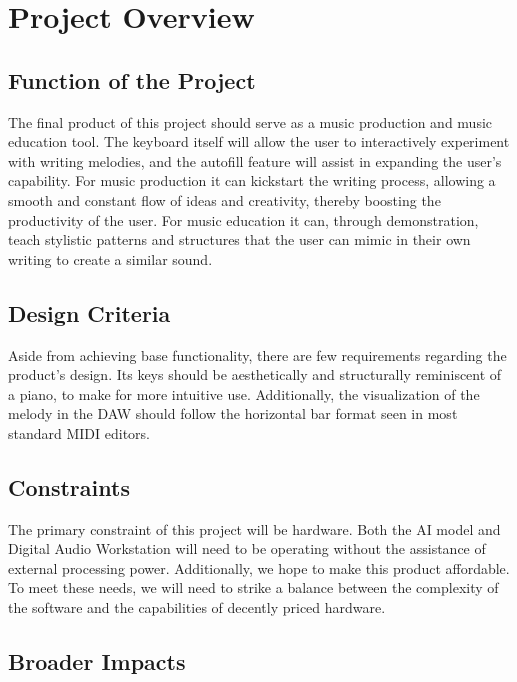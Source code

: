 \section{Project Overview}
\subsection{Function of the Project}

The final product of this project should serve as a music production and music
education tool. The keyboard itself will allow the user to interactively experiment with
writing melodies, and the autofill feature will assist in expanding the user’s capability.
For music production it can kickstart the writing process, allowing a smooth and
constant flow of ideas and creativity, thereby boosting the productivity of the user.
For music education it can, through demonstration, teach stylistic patterns and
structures that the user can mimic in their own writing to create a similar sound.


\subsection{Design Criteria}

Aside from achieving base functionality, there are few requirements regarding the
product’s design. Its keys should be aesthetically and structurally reminiscent of a
piano, to make for more intuitive use. Additionally, the visualization of the melody in
the DAW should follow the horizontal bar format seen in most standard MIDI editors.

\subsection{Constraints}

The primary constraint of this project will be hardware. Both the AI model and Digital
Audio Workstation will need to be operating without the assistance of external
processing power. Additionally, we hope to make this product affordable. To meet
these needs, we will need to strike a balance between the complexity of the software
and the capabilities of decently priced hardware.



\subsection{Broader Impacts}

